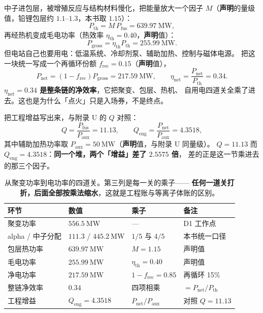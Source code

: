 中子进包层，被增殖反应与结构材料慢化，把能量放大一个因子
$M$（\textbf{声明}的量级值，铅锂包层约 $1.1$--$1.3$，本书取 $1.15$）：
\begin{equation}
P_{\mathrm{th}} = M\,P_{\mathrm{fus}} = 639.97\ \mathrm{MW},
\label{eq:app-z-pth}
\end{equation}
再经热机变成毛电功率（热效率 $\eta_{\mathrm{th}}=0.40$，\textbf{声明}值）：
\begin{equation}
P_{\mathrm{gross}} = \eta_{\mathrm{th}}P_{\mathrm{th}} = 255.99\ \mathrm{MW}.
\label{eq:app-z-pgross}
\end{equation}
但电站自己也要用电：低温系统、冷却剂泵、辅助加热、控制与磁体电源。
把这一块统一写成一个再循环份额 $f_{\mathrm{rec}}=0.15$（\textbf{声明}值），
\begin{equation}
P_{\mathrm{net}} = \left(1-f_{\mathrm{rec}}\right)P_{\mathrm{gross}}
= 217.59\ \mathrm{MW},
\qquad
\eta_{\mathrm{net}} = \frac{P_{\mathrm{net}}}{P_{\mathrm{th}}} = 0.34.
\label{eq:app-z-pnet}
\end{equation}
\textbf{$\eta_{\mathrm{net}}=0.34$ 是整条链的净效率}，它把聚变、包层、热机、
自用电四道关全乘了进去。这也是为什么「点火」只是入场券，不是终点。

把工程增益写出来，与附录 U 的 $Q$ 对照：
\begin{equation}
Q = \frac{P_{\mathrm{fus}}}{P_{\mathrm{aux}}} = 11.13,
\qquad
Q_{\mathrm{eng}} = \frac{P_{\mathrm{net}}}{P_{\mathrm{aux}}} = 4.3518,
\label{eq:app-z-qeng}
\end{equation}
其中辅助加热功率取 $P_{\mathrm{aux}}=50\ \mathrm{MW}$（\textbf{声明}值，与附录 U 同量级）。
$Q=11.13$ 而 $Q_{\mathrm{eng}}=4.3518$：\textbf{同一个堆，两个「增益」差了 $2.5575$ 倍}，
差的正是这一节乘进去的那三个因子。

\begin{table}[htbp]
\centering
\small
\caption{从聚变功率到电功率的四道关。第三列是每一关的乘子——
\textbf{任何一道关打折，后面全部按乘法缩水}，这就是工程账与等离子体账的区别。}
\label{tab:app-z-chain}
\begin{tabular}{p{3.6cm}p{3.2cm}p{3.2cm}p{3.2cm}}
\toprule
环节 & 数值 & 乘子 & 备注 \\
\midrule
聚变功率 & $556.5\ \mathrm{MW}$ & --- & D1 工作点 \\
alpha / 中子分配 & $111.3$ / $445.2\ \mathrm{MW}$ & $1/5$ 与 $4/5$ & 本书统一口径 \\
包层热功率 & $639.97\ \mathrm{MW}$ & $M = 1.15$ & 声明值 \\
毛电功率 & $255.99\ \mathrm{MW}$ & $\eta_{\mathrm{th}} = 0.40$ & 声明值 \\
净电功率 & $217.59\ \mathrm{MW}$ & $1-f_{\mathrm{rec}} = 0.85$ & 再循环 15\% \\
整链净效率 & $0.34$ & 四项相乘 & $=P_{\mathrm{net}}/P_{\mathrm{th}}$ \\
工程增益 & $Q_{\mathrm{eng}} = 4.3518$ & $P_{\mathrm{net}}/P_{\mathrm{aux}}$ & 对照 $Q = 11.13$ \\
\bottomrule
\end{tabular}

\end{table}

